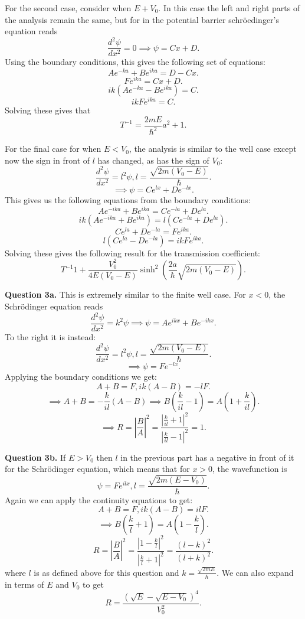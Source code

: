 \documentclass[letterpaper, reqno,11pt]{article}
\begin{document}
For the second case, consider when $E+V_0$. In this case the left and right parts of the analysis remain the same, but for in the potential barrier schr\"oedinger's equation reads
\[
\frac{d^2\psi}{dx^2}=0\implies \psi=Cx+D
.\]
Using the boundary conditions, this gives the following set of equations:
\[
Ae^{-ka}+Be^{ika}=D-Cx
.\]
\[
Fe^{ika}=Cx+D
.\]
\[
ik(Ae^{-ka}-Be^{ika})=C
.\]
\[
ikFe^{ika}=C
.\]
Solving these gives that
\[
T^{-1}=\frac{2mE}{\hbar^2}a^2+1
.\]

For the final case for when $E<V_0$, the analysis is similar to the well case except now the sign in front of  $l$ has changed, as has the sign of $V_0$:
\[
\frac{d^2\psi}{dx^2}=l^2\psi, l=\frac{\sqrt{2m(V_0-E)} }{\hbar}
.\]
\[
\implies\psi=Ce^{lx}+De^{-lx}
.\]
This gives us the following equations from the boundary conditions:
\[
Ae^{-ika}+Be^{ika}=Ce^{-la}+De^{la}
.\]
\[
ik\left( Ae^{-ika}+Be^{ika} \right)=l\left( Ce^{-la}+De^{la} \right) 
.\]
\[
Ce^{la}+De^{-la}=Fe^{ika}
.\]
\[
l\left( Ce^{la}-De^{-la} \right) =ikFe^{ika}
.\]
Solving these gives the following result for the transmission coefficient: 
\[
T^{-1}1+\frac{V_0^2}{4E(V_0-E)}\sinh^2\left( \frac{2a}{\hbar}\sqrt{2m(V_0-E)}  \right) 
.\]

{\noindent\bf Question 3a.} This is extremely similar to the finite well case. For $x<0$, the Schr\"odinger equation reads
\[
\frac{d^2\psi}{dx^2}=k^2\psi\implies \psi=Ae^{ikx}+Be^{-ikx}
.\]
To the right it is instead:
\[
\frac{d^2\psi}{dx^2}=l^2\psi, l=\frac{\sqrt{2m(V_0-E)} }{\hbar}
.\]
\[
\implies \psi=Fe^{-lx}
.\]
Applying the boundary conditions we get:
\[
A+B=F, ik(A-B)=-lF
.\]
\[
\implies A+B=-\frac{k}{il}(A-B)\implies B\left( \frac{k}{il}-1 \right) =A\left( 1+\frac{k}{il} \right) 
.\]
\[
\implies R=\left| \frac{B}{A} \right|^2=\frac{\left| \frac{k}{il}+1 \right|^2}{\left| \frac{k}{il}-1 \right|^2}=1
.\]

{\noindent\bf Question 3b.} If $E>V_0$ then $l$ in the previous part has a negative in front of it for the Schr\"odinger equation, which means that for $x>0$, the wavefunction is
\[
\psi=Fe^{ilx}, l=\frac{\sqrt{2m(E-V_0)} }{\hbar}
.\]
Again we can apply the continuity equations to get:
\[
A+B=F, ik(A-B)=ilF
.\]
\[
\implies B\left( \frac{k}{l}+1 \right) =A\left( 1-\frac{k}{l} \right) 
.\]
\[
R=\left| \frac{B}{A} \right| ^2=\frac{|1-\frac{k}{l}|^2}{|\frac{k}{l}+1|^2}=\frac{(l-k)^2}{(l+k)^2}
.\]
where $l$ is as defined above for this question and $k=\frac{\sqrt{2mE} }{\hbar}$. We can also expand in terms of $E$ and $ V_0$ to get
\[
R=\frac{\left( \sqrt{E} -\sqrt{E-V_0}  \right)^{4} }{V_0^2}
.\]
\end{document}
